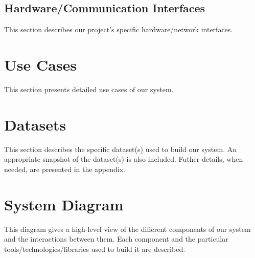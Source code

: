 \subsection{Hardware/Communication Interfaces}
This section describes our project's specific hardware/network interfaces.

\section{Use Cases}
This section presents detailed use cases of our system.

\section{Datasets}
This section describes the specific dataset(s) used to build our system. An appropriate snapshot of the dataset(s) is also included. Futher details, when needed, are presented in the appendix.

\section{System Diagram}
This diagram gives a high-level view of the different components of our system and the interactions between them. Each component and the particular tools/technologies/libraries used to build it are described.